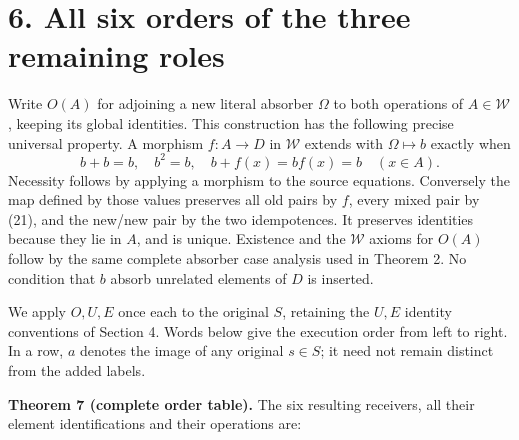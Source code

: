 \documentclass[
]{article}
\begin{document}
\section{6. All six orders of the three remaining
roles}\label{all-six-orders-of-the-three-remaining-roles}

Write \(O(A)\) for adjoining a new literal absorber \(\Omega\) to both
operations of \(A\in\mathcal W\), keeping its global identities. This
construction has the following precise universal property. A morphism
\(f:A\to D\) in \(\mathcal W\) extends with \(\Omega\mapsto b\) exactly
when \[
b+b=b,\quad b^2=b,\quad b+f(x)=bf(x)=b\quad(x\in A).
\tag{21}
\] Necessity follows by applying a morphism to the source equations.
Conversely the map defined by those values preserves all old pairs by
\(f\), every mixed pair by (21), and the new/new pair by the two
idempotences. It preserves identities because they lie in \(A\), and is
unique. Existence and the \(\mathcal W\) axioms for \(O(A)\) follow by
the same complete absorber case analysis used in Theorem 2. No condition
that \(b\) absorb unrelated elements of \(D\) is inserted.

We apply \(O,U,E\) once each to the original \(S\), retaining the
\(U,E\) identity conventions of Section 4. Words below give the
execution order from left to right. In a row, \(a\) denotes the image of
any original \(s\in S\); it need not remain distinct from the added
labels.

\textbf{Theorem 7 (complete order table).} The six resulting receivers,
all their element identifications and their operations are:
\end{document}
